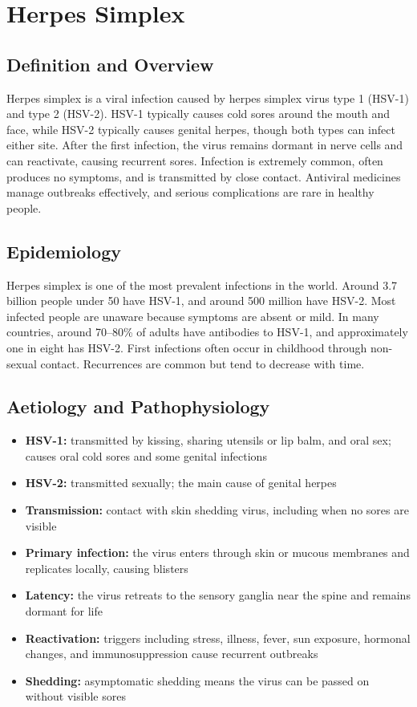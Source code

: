 \chapter{Herpes Simplex}

\section*{Definition and Overview}
Herpes simplex is a viral infection caused by herpes simplex virus type 1 (HSV-1) and type 2 (HSV-2). HSV-1 typically causes cold sores around the mouth and face, while HSV-2 typically causes genital herpes, though both types can infect either site. After the first infection, the virus remains dormant in nerve cells and can reactivate, causing recurrent sores. Infection is extremely common, often produces no symptoms, and is transmitted by close contact. Antiviral medicines manage outbreaks effectively, and serious complications are rare in healthy people.

\section*{Epidemiology}
Herpes simplex is one of the most prevalent infections in the world. Around 3.7 billion people under 50 have HSV-1, and around 500 million have HSV-2. Most infected people are unaware because symptoms are absent or mild. In many countries, around 70--80\% of adults have antibodies to HSV-1, and approximately one in eight has HSV-2. First infections often occur in childhood through non-sexual contact. Recurrences are common but tend to decrease with time.

\section*{Aetiology and Pathophysiology}
\begin{itemize}
    \item \textbf{HSV-1:} transmitted by kissing, sharing utensils or lip balm, and oral sex; causes oral cold sores and some genital infections
    \item \textbf{HSV-2:} transmitted sexually; the main cause of genital herpes
    \item \textbf{Transmission:} contact with skin shedding virus, including when no sores are visible
    \item \textbf{Primary infection:} the virus enters through skin or mucous membranes and replicates locally, causing blisters
    \item \textbf{Latency:} the virus retreats to the sensory ganglia near the spine and remains dormant for life
    \item \textbf{Reactivation:} triggers including stress, illness, fever, sun exposure, hormonal changes, and immunosuppression cause recurrent outbreaks
    \item \textbf{Shedding:} asymptomatic shedding means the virus can be passed on without visible sores
\end{itemize}

